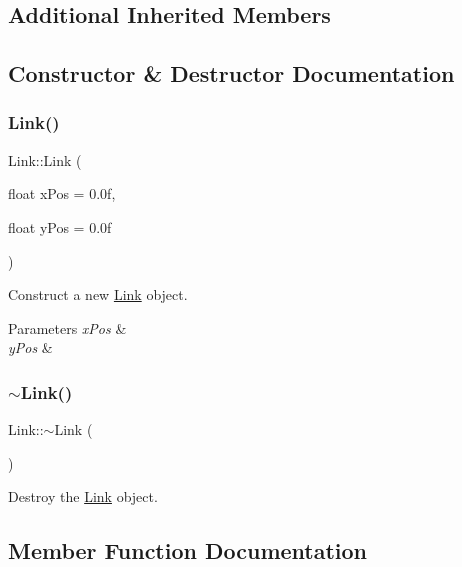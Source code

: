 \subsection*{Additional Inherited Members}


\subsection{Constructor \& Destructor Documentation}
\mbox{\label{classLink_ab709f50a45a23296e9e78baf5bb75c67}} 
\subsubsection{\texorpdfstring{Link()}{Link()}}
{\footnotesize\ttfamily Link\+::\+Link (\begin{DoxyParamCaption}\item[{float}]{x\+Pos = {\ttfamily 0.0f},  }\item[{float}]{y\+Pos = {\ttfamily 0.0f} }\end{DoxyParamCaption})}



Construct a new \mbox{\hyperlink{classLink}{Link}} object. 


\begin{DoxyParams}{Parameters}
{\em x\+Pos} & \\
\hline
{\em y\+Pos} & \\
\hline
\end{DoxyParams}
\mbox{\label{classLink_a7be82ff147159742ad26febff8a9439b}} 
\subsubsection{\texorpdfstring{$\sim$Link()}{~Link()}}
{\footnotesize\ttfamily Link\+::$\sim$\+Link (\begin{DoxyParamCaption}{ }\end{DoxyParamCaption})\hspace{0.3cm}{\ttfamily [default]}}



Destroy the \mbox{\hyperlink{classLink}{Link}} object. 



\subsection{Member Function Documentation}
\mbox{\label{classLink_a0d56dc31b6bf76258f50a393e92f46c4}} 
